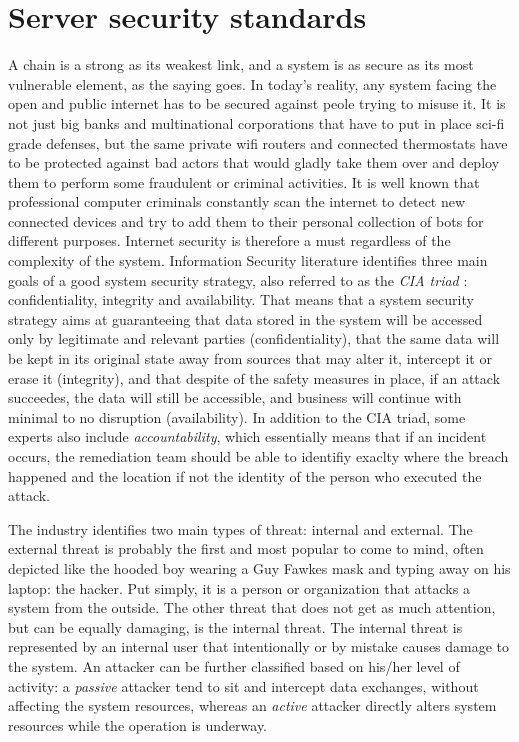 \section{Server security standards}
A chain is a strong as its weakest link, and a system is as secure as its
most vulnerable element, as the saying goes. In today's reality, any system
facing the open and public internet has to be secured against peole trying to
misuse it. It is not just big banks and multinational corporations that have to
put in place sci-fi grade defenses, but the same private wifi routers and
connected thermostats have to be protected against bad actors that would gladly
take them over and deploy them to perform some fraudulent or criminal
activities. It is well known that professional computer criminals constantly
scan the internet to detect new connected devices and try to add them to their
personal collection of bots for different purposes.
Internet security is therefore a must regardless of the complexity of the
system. Information Security literature identifies three main goals of a good
system security strategy, also referred to as the \emph{CIA triad} \cite{DP00}:
confidentiality, integrity and availability. That means that a system security
strategy aims at guaranteeing that data stored in the system will be accessed
only by legitimate and relevant parties (confidentiality), that the same data
will be kept in its original state away from sources that may alter it,
intercept it or erase it (integrity), and that despite of the safety measures in
place, if an attack succeedes, the data will still be accessible, and business
will continue with minimal to no disruption (availability). In addition to the
CIA triad, some experts also include \emph{accountability}, which essentially
means that if an incident occurs, the remediation team should be able to
identifiy exaclty where the breach happened and the location if not the identity
of the person who executed the attack.

The industry identifies two main types of threat: internal and external.
The external threat is probably the first and most popular to come to mind,
often depicted like the hooded boy wearing a Guy Fawkes mask and typing away on
his laptop: the hacker. Put simply, it is a person or organization that attacks
a system from the outside. The other threat that does not get as much
attention, but can be equally damaging, is the internal threat. The internal
threat is represented by an internal user that intentionally or by mistake
causes damage to the system. An attacker can be further classified based on
his/her level of activity: a \emph{passive} attacker tend to sit and intercept
data exchanges, without affecting the system resources, whereas an \emph{active}
attacker directly alters system resources while the operation is underway.

